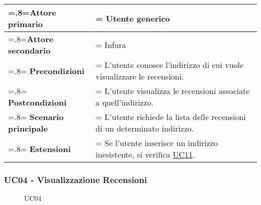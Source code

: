            \begin{center}
                \renewcommand{\arraystretch}{1.5}
                \renewcommand\tabularxcolumn[1]{m{#1}}
                \begin{tabularx}{0.9\textwidth} {
                    >{\hsize=.8\hsize\linewidth=\hsize}X
                    >{\hsize=1.2\hsize\linewidth=\hsize}X}
                    \hline
                    \textbf{Attore primario} & Utente generico \\
                    \hline
                    \textbf{Attore secondario} & Infura \\
                    \hline
                    \textbf{Precondizioni} & L'utente conosce l'indirizzo di cui vuole visualizzare le recensioni. \\
                    \hline
                    \textbf{Postcondizioni} & L'utente visualizza le recensioni associate a quell'indirizzo. \\
                    \hline
                    \textbf{Scenario principale} & L'utente richiede la lista delle recensioni di un determinato indirizzo. \\
                    \hline
                    \textbf{Estensioni} & Se l'utente inserisce un indirizzo inesistente, si verifica \hyperref[UC11]{UC11}. \\
                    \hline
                \end{tabularx}
            \end{center}

        \subsubsection{UC04 - Visualizzazione Recensioni}
        \label{UC04}

            \begin{figure}[H]
                \centering
                
                \caption{UC04}
            \end{figure}

